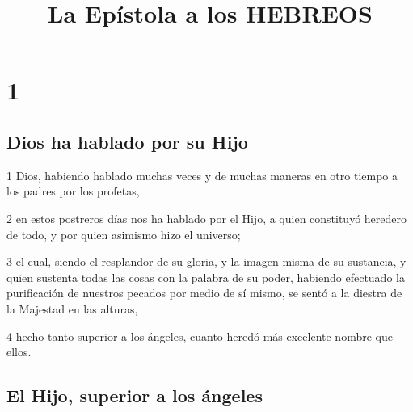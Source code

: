 
\title{La Epístola a los HEBREOS}

\chapter{1}

\section*{Dios ha hablado por su Hijo}

\par 1 Dios, habiendo hablado muchas veces y de muchas maneras en otro tiempo a los padres por los profetas,
\par 2 en estos postreros días nos ha hablado por el Hijo, a quien constituyó heredero de todo, y por quien asimismo hizo el universo;
\par 3 el cual, siendo el resplandor de su gloria, y la imagen misma de su sustancia, y quien sustenta todas las cosas con la palabra de su poder, habiendo efectuado la purificación de nuestros pecados por medio de sí mismo, se sentó a la diestra de la Majestad en las alturas,
\par 4 hecho tanto superior a los ángeles, cuanto heredó más excelente nombre que ellos.

\section*{El Hijo, superior a los ángeles}

